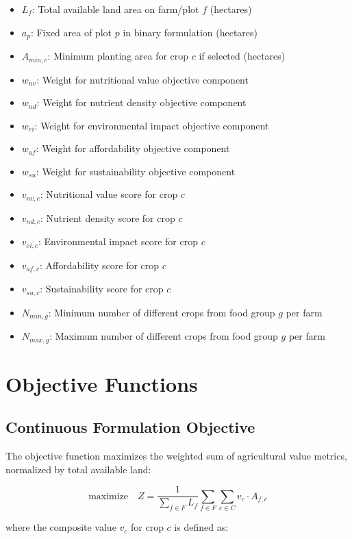 \documentclass{article}
\begin{document}
\begin{itemize}
    \item $L_f$: Total available land area on farm/plot $f$ (hectares)
    \item $a_p$: Fixed area of plot $p$ in binary formulation (hectares)
    \item $A_{min,c}$: Minimum planting area for crop $c$ if selected (hectares)
    \item $w_{nv}$: Weight for nutritional value objective component
    \item $w_{nd}$: Weight for nutrient density objective component
    \item $w_{ei}$: Weight for environmental impact objective component
    \item $w_{af}$: Weight for affordability objective component
    \item $w_{su}$: Weight for sustainability objective component
    \item $v_{nv,c}$: Nutritional value score for crop $c$
    \item $v_{nd,c}$: Nutrient density score for crop $c$
    \item $v_{ei,c}$: Environmental impact score for crop $c$
    \item $v_{af,c}$: Affordability score for crop $c$
    \item $v_{su,c}$: Sustainability score for crop $c$
    \item $N_{min,g}$: Minimum number of different crops from food group $g$ per farm
    \item $N_{max,g}$: Maximum number of different crops from food group $g$ per farm
\end{itemize}

\section{Objective Functions}

\subsection{Continuous Formulation Objective}

The objective function maximizes the weighted sum of agricultural value metrics, normalized by total available land:

$$\text{maximize} \quad Z = \frac{1}{\sum_{f \in F} L_f} \sum_{f \in F} \sum_{c \in C} v_c \cdot A_{f,c}$$

where the composite value $v_c$ for crop $c$ is defined as:
\end{document}

